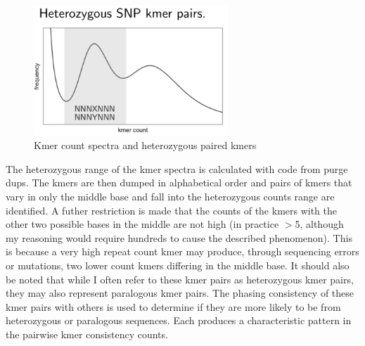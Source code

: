 \begin{figure}[htbp!]

\caption{Kmer count spectra and heterozygous paired kmers}
\label{figure:kmc}
\begin{centering}
\includegraphics[width=0.65\textwidth]{kmc.png}
\end{centering}

\end{figure}

\par{
The heterozygous range of the kmer spectra is calculated with code from purge dups\cite{purgedups}. The kmers are then dumped in alphabetical order and pairs of kmers that vary in only the middle base and fall into the heterozygous counts range are identified. A futher restriction is made that the counts of the kmers with the other two possible bases in the middle are not high (in practice $>$5, although my reasoning would require hundreds to cause the described phenomenon). This is because a very high repeat count kmer may produce, through sequencing errors or mutations, two lower count kmers differing in the middle base. It should also be noted that while I often refer to these kmer pairs as heterozygous kmer pairs, they may also represent paralogous kmer pairs. The phasing consistency of these kmer pairs with others is used to determine if they are more likely to be from heterozygous or paralogous sequences. Each produces a characteristic pattern in the pairwise kmer consistency counts.
}

